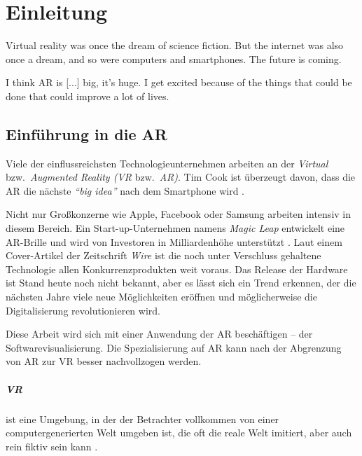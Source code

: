 \chapter{Einleitung}

\begin{fquote}
Virtual reality was once the dream of science fiction. But the internet was also once a dream, and so were computers and smartphones. The future is coming.
\end{fquote}

\begin{fquote}
I think AR is [...] big, it’s huge. I get excited because of the things that could be done that could improve a lot of lives.
\end{fquote}

\section{Einführung in die AR}
Viele der einflussreichsten Technologieunternehmen arbeiten an der \emph{Virtual} bzw.\ \emph{Augmented Reality (VR} bzw.\ \emph{AR)}. Tim Cook ist überzeugt davon, dass die AR die nächste \emph{``big idea''} nach dem Smartphone wird \cite{theindependent2017apple}.

Nicht nur Großkonzerne wie Apple, Facebook oder Samsung arbeiten intensiv in diesem Bereich. Ein Start-up-Unternehmen namens \emph{Magic Leap} entwickelt eine AR-Brille und wird von Investoren in Milliardenhöhe unterstützt \cite{kelly2016untold}. Laut einem Cover-Artikel der Zeitschrift \emph{Wire} ist die noch unter Verschluss gehaltene Technologie allen Konkurrenzprodukten weit voraus. Das Release der Hardware ist Stand heute noch nicht bekannt, aber es lässt sich ein Trend erkennen, der die nächsten Jahre viele neue Möglichkeiten eröffnen und möglicherweise die Digitalisierung revolutionieren wird.

Diese Arbeit wird sich mit einer Anwendung der AR beschäftigen -- der Softwarevisualisierung. Die Spezialisierung auf AR kann nach der Abgrenzung von AR zur VR besser nachvollzogen werden.

\paragraph{VR} ist eine Umgebung, in der der Betrachter vollkommen von einer computergenerierten Welt umgeben ist, die oft die reale Welt imitiert, aber auch rein fiktiv sein kann \cite{milgram1995augmented}.\\

